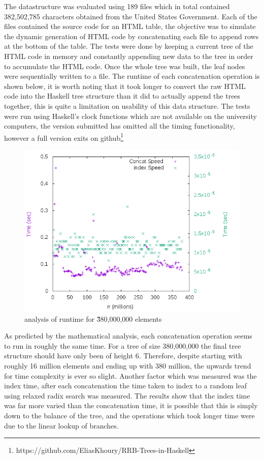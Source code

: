 \documentclass[11pt,a4paper,oneside]{article}
\begin{document}
The datastructure was evaluated using 189 files which in total contained 382,502,785 characters obtained from the United States Government\citep{obama2014complaints}. Each of the files contained the source code for an HTML table, the objective was to simulate the dynamic generation of HTML code by concatenating each file to append rows at the bottom of the table. The tests were done by keeping a current tree of the HTML code in memory and constantly appending new data to the tree in order to accumulate the HTML code. Once the whole tree was built, the leaf nodes were sequentially written to a file. The runtime of each concatenation operation is shown below, it is worth noting that it took longer to convert the raw HTML code into the Haskell tree structure than it did to actually append the trees together, this is quite a limitation on usability of this data structure. The tests were run using Haskell's clock functions which are not available on the university computers, the version submitted has omitted all the timing functionality, however a full version exits on github\footnote{https://github.com/EliasKhoury/RRB-Trees-in-Haskell}

\begin{figure}[H]
	\centering
	\includegraphics[scale=0.75]{img/analysis.png}
	\caption{analysis of runtime for \~380,000,000 elements}
\end{figure}

As predicted by the mathematical analysis, each concatenation operation seems to run in roughly the same time. For a tree of size 380,000,000 the final tree structure should have only been of height 6. Therefore, despite starting with roughly 16 million elements and ending up with 380 million, the upwards trend for time complexity is ever so slight. Another factor which was measured was the index time, after each concatenation the time taken to index to a random leaf using relaxed radix search was measured. The results show that the index time was far more varied than the concatenation time, it is possible that this is simply down to the balance of the tree, and the operations which took longer time were due to the linear lookup of branches.
\end{document}
